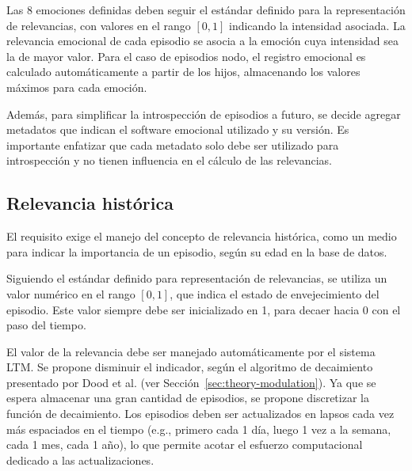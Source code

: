 Las 8 emociones definidas deben seguir el estándar definido para la representación de relevancias, con valores en el rango $[0, 1]$ indicando la intensidad asociada. La relevancia emocional de cada episodio se asocia a la emoción cuya intensidad sea la de mayor valor. Para el caso de episodios nodo, el registro emocional es calculado automáticamente a partir de los hijos, almacenando los valores máximos para cada emoción.

Además, para simplificar la introspección de episodios a futuro, se decide agregar metadatos que indican el software emocional utilizado y su versión. Es importante enfatizar que cada metadato solo debe ser utilizado para introspección y no tienen influencia en el cálculo de las relevancias.


\subsection{Relevancia histórica}\label{sec:design_ep_rel_hist}

El requisito  exige el manejo del concepto de relevancia histórica, como un medio para indicar la importancia de un episodio, según su edad en la base de datos. 

Siguiendo el estándar definido para representación de relevancias, se utiliza un valor numérico en el rango $[0, 1]$, que indica el estado de envejecimiento del episodio. Este valor siempre debe ser inicializado en 1, para decaer hacia 0 con el paso del tiempo.

El valor de la relevancia debe ser manejado automáticamente por el sistema LTM. Se propone disminuir el indicador, según el algoritmo de decaimiento presentado por Dood et al. (ver Sección~\ref{sec:theory-modulation}). Ya que se espera almacenar una gran cantidad de episodios, se propone discretizar la función de decaimiento. Los episodios deben ser actualizados en lapsos cada vez más espaciados en el tiempo (e.g., primero cada 1 día, luego 1 vez a la semana, cada 1 mes, cada 1 año), lo que permite acotar el esfuerzo computacional dedicado a las actualizaciones.


